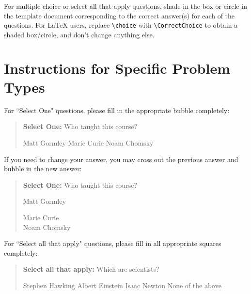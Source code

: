 \documentclass[11pt,addpoints,answers]{exam}
\numberwithin{equation}{section} %
\numberwithin{figure}{section} %
\numberwithin{table}{section} %
\begin{document}

For multiple choice or select all that apply questions, shade in the box or circle in the template document corresponding to the correct answer(s) for each of the questions. For \LaTeX{} users, replace \lstinline{\choice} with \lstinline{\CorrectChoice} to obtain a shaded box/circle, and don't change anything else.



\clearpage

\section*{Instructions for Specific Problem Types}

For ``Select One" questions, please fill in the appropriate bubble completely:

\begin{quote}
\textbf{Select One:} Who taught this course?
     \begin{checkboxes}
     \CorrectChoice Matt Gormley
     \choice Marie Curie
     \choice Noam Chomsky
    \end{checkboxes}
\end{quote}

If you need to change your answer, you may cross out the previous answer and bubble in the new answer:

\begin{quote}
\textbf{Select One:} Who taught this course?
\begin{list}{}
     \item\CIRCLE{} Matt Gormley
     \item\Circle{} Marie Curie\\
     \xcancel{\CIRCLE}{} Noam Chomsky
\end{list}
\end{quote}


For ``Select all that apply" questions, please fill in all appropriate squares completely:

\begin{quote}
\textbf{Select all that apply:} Which are scientists?
{
    \checkboxchar{$\Box$} \checkedchar{$\blacksquare$}
    \begin{checkboxes}
     \choice Stephen Hawking 
     \CorrectChoice Albert Einstein
     \choice Isaac Newton
     \choice None of the above
    \end{checkboxes}
    }
\end{quote}
\end{document}

